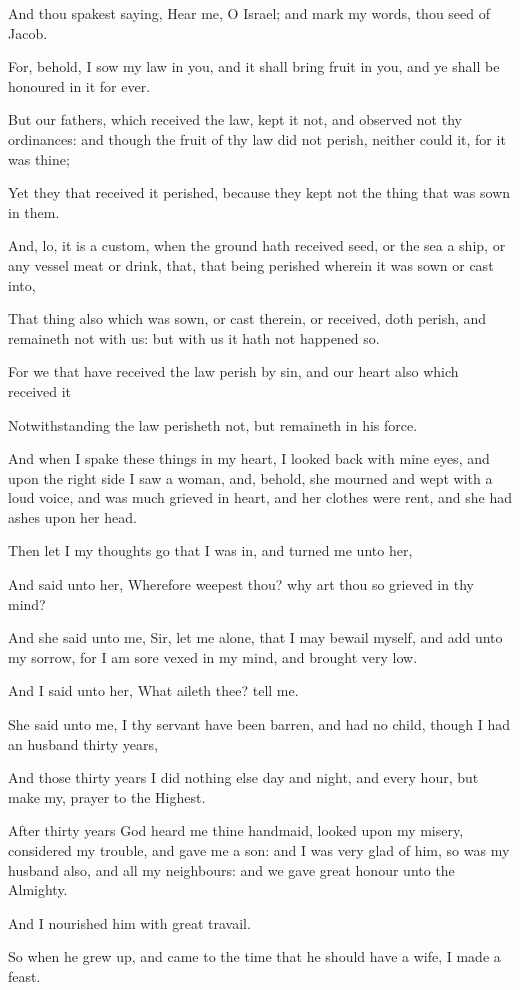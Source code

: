 {\par }{\PP {}And thou spakest saying, Hear me, O Israel; and mark my words, thou seed of Jacob.
\par }{\PP {}For, behold, I sow my law in you, and it shall bring fruit in you, and ye shall be honoured in it for ever.
\par }{\PP {}But our fathers, which received the law, kept it not, and observed not thy ordinances: and though the fruit of thy law did not perish, neither could it, for it was thine;
\par }{\PP {}Yet they that received it perished, because they kept not the thing that was sown in them.
\par }{\PP {}And, lo, it is a custom, when the ground hath received seed, or the sea a ship, or any vessel meat or drink, that, that being perished wherein it was sown or cast into,
\par }{\PP {}That thing also which was sown, or cast therein, or received, doth perish, and remaineth not with us: but with us it hath not happened so.
\par }{\PP {}For we that have received the law perish by sin, and our heart also which received it
\par }{\PP {}Notwithstanding the law perisheth not, but remaineth in his force.
\par }{\PP {}And when I spake these things in my heart, I looked back with mine eyes, and upon the right side I saw a woman, and, behold, she mourned and wept with a loud voice, and was much grieved in heart, and her clothes were rent, and she had ashes upon her head.
\par }{\PP {}Then let I my thoughts go that I was in, and turned me unto her,
\par }{\PP {}And said unto her, Wherefore weepest thou? why art thou so grieved in thy mind?
\par }{\PP {}And she said unto me, Sir, let me alone, that I may bewail myself, and add unto my sorrow, for I am sore vexed in my mind, and brought very low.
\par }{\PP {}And I said unto her, What aileth thee? tell me.
\par }{\PP {}She said unto me, I thy servant have been barren, and had no child, though I had an husband thirty years,
\par }{\PP {}And those thirty years I did nothing else day and night, and every hour, but make my, prayer to the Highest.
\par }{\PP {}After thirty years God heard me thine handmaid, looked upon my misery, considered my trouble, and gave me a son: and I was very glad of him, so was my husband also, and all my neighbours: and we gave great honour unto the Almighty.
\par }{\PP {}And I nourished him with great travail.
\par }{\PP {}So when he grew up, and came to the time that he should have a wife, I made a feast.

}
